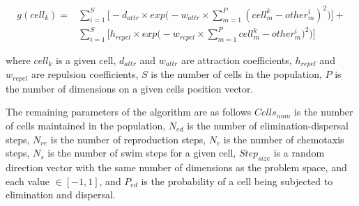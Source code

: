 \begin{align*}
	g(cell_k) = 
	&\sum_{i=1}^S\bigg[-d_{attr}\times exp\bigg(-w_{attr}\times \sum_{m=1}^P (cell_m^k - other_m^i)^2 \bigg) \bigg] + \\
	&\sum_{i=1}^S\bigg[h_{repel}\times exp\bigg(-w_{repel}\times \sum_{m=1}^P cell_m^k - other_m^i)^2 \bigg) \bigg]
\end{align*}

where $cell_k$ is a given cell, $d_{attr}$ and $w_{attr}$ are attraction coefficients, $h_{repel}$ and $w_{repel}$ are repulsion coefficients, $S$ is the number of cells in the population, $P$ is the number of dimensions on a given cells position vector.

The remaining parameters of the algorithm are as follows $Cells_{num}$ is the number of cells maintained in the population, $N_{ed}$ is the number of elimination-dispersal steps, $N_{re}$ is the number of reproduction steps, $N_{c}$ is the number of chemotaxis steps, $N_{s}$ is the number of swim steps for a given cell, $Step_{size}$ is a random direction vector with the same number of dimensions as the problem space, and each value $\in [-1,1]$, and $P_{ed}$ is the probability of a cell being subjected to elimination and dispersal. 

